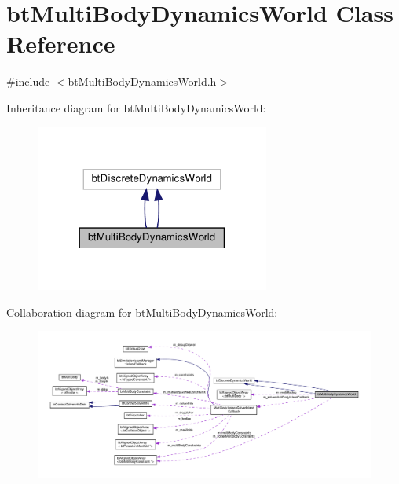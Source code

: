 \hypertarget{classbtMultiBodyDynamicsWorld}{}\section{bt\+Multi\+Body\+Dynamics\+World Class Reference}
\label{classbtMultiBodyDynamicsWorld}


{\ttfamily \#include $<$bt\+Multi\+Body\+Dynamics\+World.\+h$>$}



Inheritance diagram for bt\+Multi\+Body\+Dynamics\+World\+:
\nopagebreak
\begin{figure}[H]
\begin{center}
\leavevmode
\includegraphics[width=218pt]{classbtMultiBodyDynamicsWorld__inherit__graph}
\end{center}
\end{figure}


Collaboration diagram for bt\+Multi\+Body\+Dynamics\+World\+:
\nopagebreak
\begin{figure}[H]
\begin{center}
\leavevmode
\includegraphics[width=350pt]{classbtMultiBodyDynamicsWorld__coll__graph}
\end{center}
\end{figure}
